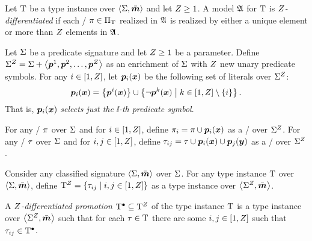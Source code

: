 \begin{definition}
Let $\mathrm{T}$ be a type instance over $\left\langle \mathrm{\Sigma},\bar{\bm{m}} \right\rangle$ and let $Z\geq1$.
A model $\mathfrak{A}$ for $\mathrm{T}$ is \emph{$Z$-differentiated}
if each \onetype/ $\pi\in{\Pi}_{\mathrm{T}}$ realized in $\mathfrak{A}$ is realized by either a
unique element or more than $Z$ elements in $\mathfrak{A}$.
\end{definition}

\begin{definition}
Let $\mathrm{\Sigma}$ be a predicate signature and let $Z\geq1$ be a parameter.
Define ${\mathrm{\Sigma}}^{Z} = \mathrm{\Sigma} + \left\langle \bm{p}^{1},\bm{p}^{2},\dots,\bm{p}^{Z} \right\rangle$ as an
enrichment of $\mathrm{\Sigma}$ with $Z$ new unary predicate symbols.
For any $i\in[1,Z]$, let $\bm{p}_{i}(\bm{x})$ be the following set of literals
over ${\mathrm{\Sigma}}^{Z}$:
\[
\bm{p}_{i}(\bm{x}) =
\left\{\bm{p}^{i}(\bm{x})\right\}\cup\left\{\lnot\bm{p}^{k}(\bm{x})\mathrel{}\middle|\mathrel{}k\in[1,Z]\setminus\left\{i\right\}\right\}.
\]
That is, $\bm{p}_{i}(\bm{x})$ \emph{selects just the $\ii$-th predicate symbol}.

For any \onetype/ $\pi$ over $\mathrm{\Sigma}$ and for $i\in[1,Z]$,
define ${\pi}_{i} = \pi\cup\bm{p}_{i}(\bm{x})$ as a \onetype/ over ${\mathrm{\Sigma}}^{Z}$.
For any \twotype/ $\tau$ over $\mathrm{\Sigma}$ and for $i,j\in[1,Z]$,
define ${\tau}_{ij} = \tau\cup\bm{p}_{i}(\bm{x})\cup\bm{p}_{j}(\bm{y})$ as a \twotype/
over ${\mathrm{\Sigma}}^{Z}$.

Consider any classified signature $\left\langle \mathrm{\Sigma},\bar{\bm{m}} \right\rangle$ over $\mathrm{\Sigma}$.
For any type instance $\mathrm{T}$ over $\left\langle \mathrm{\Sigma},\bar{\bm{m}} \right\rangle$,
define ${\mathrm{T}}^{Z} = \left\{{\tau}_{ij}\mathrel{}\middle|\mathrel{}i,j\in[1,Z]\right\}$ as a type
instance over $\left\langle {\mathrm{\Sigma}}^{Z},\bar{\bm{m}} \right\rangle$.

A \emph{$Z$-differentiated promotion} $\mathrm{T}^{\bullet}\subseteq{\mathrm{T}}^{Z}$ of the type
instance $\mathrm{T}$ is a type instance over $\left\langle {\mathrm{\Sigma}}^{Z},\bar{\bm{m}} \right\rangle$
such that for each $\tau\in\mathrm{T}$ there are some $i,j\in[1,Z]$ such that
${\tau}_{ij}\in\mathrm{T}^{\bullet}$.
\end{definition}

